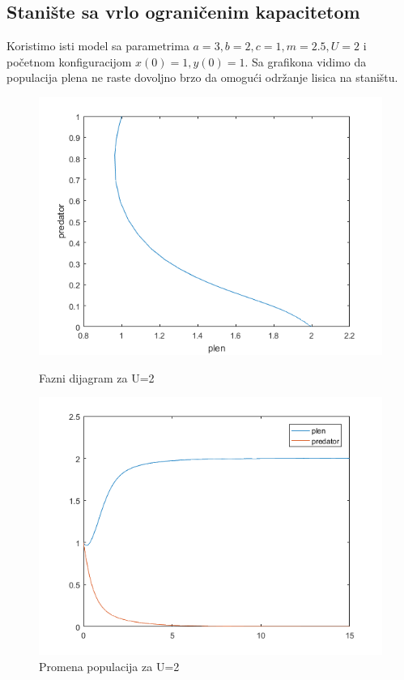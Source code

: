 \documentclass[a4paper]{article}
\begin{document}
\subsection{Stanište sa vrlo ograničenim kapacitetom}
\label{sub:log_mod_ogr}

Koristimo isti model sa parametrima $a=3, b=2, c=1, m=2.5, U=2$
i početnom konfiguracijom $x(0)=1, y(0)=1$.
Sa grafikona vidimo da populacija plena ne raste dovoljno brzo da omogući
održanje lisica na staništu.

\begin{figure}[H]
    \centering
    \begin{minipage}{0.45\textwidth}
        \centering
        \includegraphics[width=1\textwidth]{images/lv_low_u_phase} %
        \caption{Fazni dijagram za U=2}
    \end{minipage}\hfill
    \begin{minipage}{0.45\textwidth}
        \centering
        \includegraphics[width=1\textwidth]{images/lv_low_u_time} %
        \caption{Promena populacija za U=2}
    \end{minipage}
\end{figure}
\end{document}
